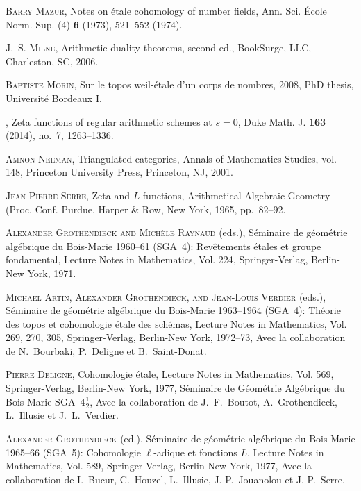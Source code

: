 \documentclass[draft,leqno,12pt]{article}
\theoremstyle{plain}
\theoremstyle{definition}
\begin{document}
\begin{thebibliography}{99}
\textsc{Barry Mazur}, Notes on \'{e}tale cohomology of number fields, Ann. Sci.
  \'{E}cole Norm. Sup. (4) \textbf{6} (1973), 521--552 (1974).

\textsc{J.~S. Milne}, Arithmetic duality theorems, second ed., BookSurge, LLC,
  Charleston, SC, 2006.

\textsc{Baptiste Morin}, Sur le topos weil-\'{e}tale d'un corps de nombres, 2008,
  {PhD} thesis, {U}niversit\'{e} {B}ordeaux {I}.

\bysame, Zeta functions of regular arithmetic schemes at {$s=0$}, Duke
  Math. J. \textbf{163} (2014), no.~7, 1263--1336.

\textsc{Amnon Neeman}, Triangulated categories, Annals of Mathematics Studies,
  vol. 148, Princeton University Press, Princeton, NJ, 2001.

\textsc{Jean-Pierre Serre}, Zeta and {$L$} functions, Arithmetical {A}lgebraic
  {G}eometry ({P}roc. {C}onf. {P}urdue, Harper \& Row, New York, 1965,
  pp.~82--92.

\textsc{Alexander Grothendieck and Mich\`ele Raynaud} (eds.), S{\'e}minaire de
  g{\'e}om{\'e}trie alg{\'e}brique du {B}ois-{M}arie 1960--61 ({SGA}~4):
  Rev\^etements \'etales et groupe fondamental, Lecture Notes in Mathematics,
  Vol. 224, Springer-Verlag, Berlin-New York, 1971.

\textsc{Michael Artin, Alexander Grothendieck, and Jean-Louis Verdier} (eds.),
  S{\'e}minaire de g{\'e}om{\'e}trie alg{\'e}brique du {B}ois-{M}arie
  1963--1964 ({SGA}~4): {T}h\'eorie des topos et cohomologie \'etale des
  sch\'emas, Lecture Notes in Mathematics, Vol. 269, 270, 305,
  Springer-Verlag, Berlin-New York, 1972--73, Avec la collaboration de
  {N}.~{B}ourbaki, {P}.~{D}eligne et {B}.~{S}aint-{D}onat.

\textsc{Pierre Deligne}, Cohomologie \'etale, Lecture Notes in Mathematics, Vol.
  569, Springer-Verlag, Berlin-New York, 1977, S{\'e}minaire de
  G{\'e}om{\'e}trie Alg{\'e}brique du {B}ois-{M}arie {SGA}~4$\frac{1}{2}$, Avec
  la collaboration de {J}.~{F}.~{B}outot, {A}.~{G}rothendieck, {L}.~Illusie et
  {J}.~{L}.~{V}erdier.

\textsc{Alexander Grothendieck} (ed.), S{\'e}minaire de g{\'e}om{\'e}trie
  alg{\'e}brique du {B}ois-{M}arie 1965--66 ({SGA}~5): {C}ohomologie
  $\ell$-adique et fonctions {$L$}, Lecture Notes in Mathematics, Vol. 589,
  Springer-Verlag, Berlin-New York, 1977, Avec la collaboration de I.~Bucur,
  C.~Houzel, L.~Illusie, J.-P.~Jouanolou et J.-P.~Serre.


\end{thebibliography}
\end{document}
